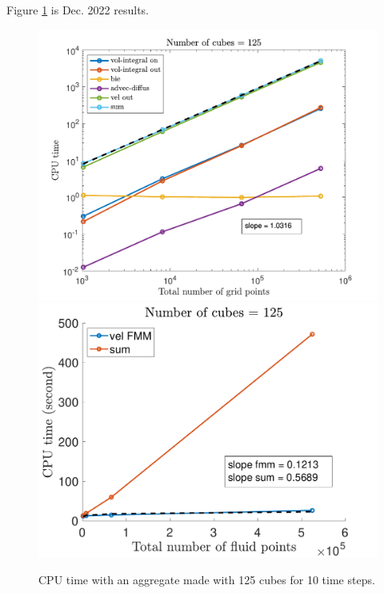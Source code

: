 \clearpage
Figure \ref{fig_time_fmm_sum} is Dec. 2022 results.
\begin{figure}[ht]
	\begin{center}
		\includegraphics[scale=0.45]{./figures/fig_time_varNx5}
		\includegraphics[scale=0.45]{./figures/fig_time_fmm_sum}
	\caption{CPU time with an aggregate made with 125 cubes for 10 time steps.}
	\label{fig_time_fmm_sum}
\end{center}
\end{figure}

